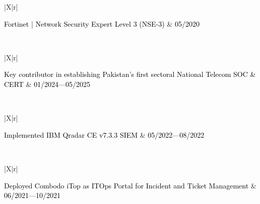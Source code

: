 \documentclass{resume}
\begin{document}
\divider \newline
\begin{tabularx}{\linewidth}{|X|r|}
    \hline
    
    \textcolor{black}{Fortinet | Network Security Expert Level 3 (NSE-3)} & 
    \textcolor{black}{05/2020} \\
    \hline
    
     \\
    \hline
\end{tabularx}
\begin{tabularx}{\linewidth}{|X|r|}
    \hline
    
    \textcolor{black}{Key contributor in establishing Pakistan's first sectoral National Telecom SOC \& CERT} & 
    \textcolor{black}{01/2024---05/2025} \\
    \hline
    
     \\
    \hline
\end{tabularx}

\divider \newline
\begin{tabularx}{\linewidth}{|X|r|}
    \hline
    
    \textcolor{black}{Implemented IBM Qradar CE v7.3.3 SIEM} & 
    \textcolor{black}{05/2022---08/2022} \\
    \hline
    
     \\
    \hline
\end{tabularx}

\divider \newline
\begin{tabularx}{\linewidth}{|X|r|}
    \hline
    
    \textcolor{black}{Deployed Combodo iTop as ITOps Portal for Incident and Ticket Management} & 
    \textcolor{black}{06/2021---10/2021} \\
    \hline
    
     \\
    \hline
\end{tabularx}
\end{document}
